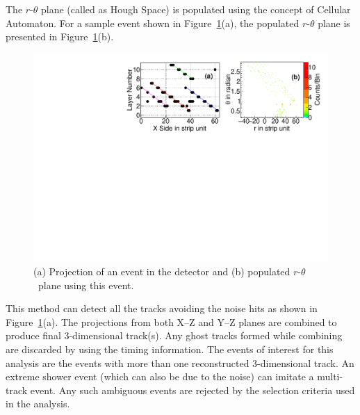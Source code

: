 \documentclass[a4paper,12pt,twoside,openany]{article}
\begin{document}
The \mbox{$r$-$\theta$} plane (called as Hough Space) is populated using the concept of Cellular Automaton\cite{cellular}. For a sample event shown in Figure~\ref{fig:houghPl}(a), the populated \mbox{$r$-$\theta$} plane is presented in Figure~\ref{fig:houghPl}(b). 
\begin{figure}
  \centering
  \includegraphics[width=0.99\linewidth]{hough_Plane_new.pdf} 
  \caption{(a) Projection of an event in the detector and (b) populated $r$-$\theta$~plane using this event.}
  \label{fig:houghPl}
\end{figure}
This method can detect all the tracks avoiding the noise hits as shown in Figure~\ref{fig:houghPl}(a). The projections from both X--Z and Y--Z planes are combined to produce final 3-dimensional track(s). Any ghost tracks formed while combining are discarded by using the timing information. The events of interest for this analysis are the events with more than one reconstructed 3-dimensional track. An extreme shower event (which can also be due to the noise) can imitate a multi-track event. Any such ambiguous events are rejected by the selection criteria used in the analysis.
\end{document}

